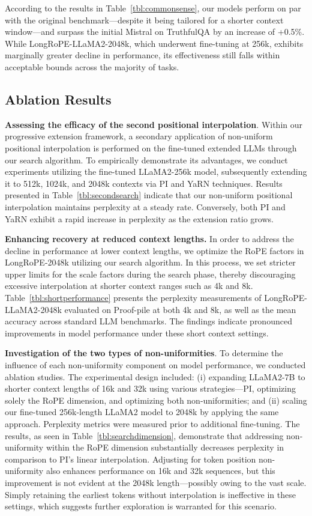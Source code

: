 According to the results in Table~\ref{tbl:commonsense}, our models perform on par with the original benchmark—despite it being tailored for a shorter context window—and surpass the initial Mistral on TruthfulQA by an increase of +0.5\%. While LongRoPE-LLaMA2-2048k, which underwent fine-tuning at 256k, exhibits marginally greater decline in performance, its effectiveness still falls within acceptable bounds across the majority of tasks.

\subsection{Ablation Results}

\textbf{Assessing the efficacy of the second positional interpolation}. Within our progressive extension framework, a secondary application of non-uniform positional interpolation is performed on the fine-tuned extended LLMs through our search algorithm. To empirically demonstrate its advantages, we conduct experiments utilizing the fine-tuned LLaMA2-256k model, subsequently extending it to 512k, 1024k, and 2048k contexts via PI and YaRN techniques. Results presented in Table~\ref{tbl:secondsearch} indicate that our non-uniform positional interpolation maintains perplexity at a steady rate. Conversely, both PI and YaRN exhibit a rapid increase in perplexity as the extension ratio grows.

\textbf{Enhancing recovery at reduced context lengths.} In order to address the decline in performance at lower context lengths, we optimize the RoPE factors in LongRoPE-2048k utilizing our search algorithm. In this process, we set stricter upper limits for the scale factors during the search phase, thereby discouraging excessive interpolation at shorter context ranges such as 4k and 8k. Table~\ref{tbl:shortperformance} presents the perplexity measurements of LongRoPE-LLaMA2-2048k evaluated on Proof-pile at both 4k and 8k, as well as the mean accuracy across standard LLM benchmarks. The findings indicate pronounced improvements in model performance under these short context settings.

\textbf{Investigation of the two types of non-uniformities}. To determine the influence of each non-uniformity component on model performance, we conducted ablation studies. The experimental design included: (i) expanding LLaMA2-7B to shorter context lengths of 16k and 32k using various strategies—PI, optimizing solely the RoPE dimension, and optimizing both non-uniformities; and (ii) scaling our fine-tuned 256k-length LLaMA2 model to 2048k by applying the same approach. Perplexity metrics were measured prior to additional fine-tuning. The results, as seen in Table~\ref{tbl:searchdimension}, demonstrate that addressing non-uniformity within the RoPE dimension substantially decreases perplexity in comparison to PI's linear interpolation. Adjusting for token position non-uniformity also enhances performance on 16k and 32k sequences, but this improvement is not evident at the 2048k length—possibly owing to the vast scale. Simply retaining the earliest tokens without interpolation is ineffective in these settings, which suggests further exploration is warranted for this scenario.

